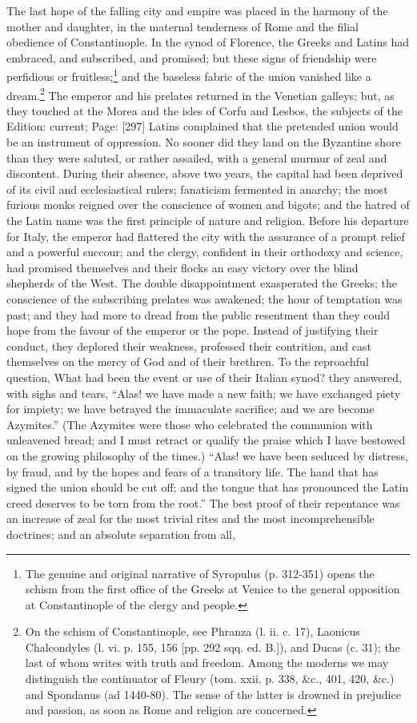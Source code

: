 The last hope of the falling city and empire was placed in the harmony of the mother and daughter, in the maternal tenderness of Rome and the filial obedience of Constantinople. In the synod of Florence, the Greeks and Latins had embraced, and subscribed, and promised; but these signs of friendship were perfidious or fruitless;\footnote{The genuine and original narrative of Syropulus (p. 312-351) opens the schism from the first office of the Greeks at Venice to the general opposition at Constantinople of the clergy and people.} and the baseless fabric of the union vanished like a dream.\footnote{On the schism of Constantinople, see Phranza (l. ii. c. 17), Laonicus Chalcondyles (l. vi. p. 155, 156 [pp. 292 sqq. ed. B.]), and Ducas (c. 31); the last of whom writes with truth and freedom. Among the moderns we may distinguish the continuator of Fleury (tom. xxii. p. 338, \&c., 401, 420, \&c.) and Spondanus (ad 1440-80). The sense of the latter is drowned in prejudice and passion, as soon as Rome and religion are concerned.} The emperor and his prelates returned in the Venetian galleys; but, as they touched at the Morea and the isles of Corfu and Lesbos, the subjects of the Edition: current; Page: [297] Latins complained that the pretended union would be an instrument of oppression. No sooner did they land on the Byzantine shore than they were saluted, or rather assailed, with a general murmur of zeal and discontent. During their absence, above two years, the capital had been deprived of its civil and ecclesiastical rulers; fanaticism fermented in anarchy; the most furious monks reigned over the conscience of women and bigots; and the hatred of the Latin name was the first principle of nature and religion. Before his departure for Italy, the emperor had flattered the city with the assurance of a prompt relief and a powerful succour; and the clergy, confident in their orthodoxy and science, had promised themselves and their flocks an easy victory over the blind shepherds of the West. The double disappointment exasperated the Greeks; the conscience of the subscribing prelates was awakened; the hour of temptation was past; and they had more to dread from the public resentment than they could hope from the favour of the emperor or the pope. Instead of justifying their conduct, they deplored their weakness, professed their contrition, and cast themselves on the mercy of God and of their brethren. To the reproachful question, What had been the event or use of their Italian synod? they answered, with sighs and tears, \texthebrew{“}Alas! we have made a new faith; we have exchanged piety for impiety; we have betrayed the immaculate sacrifice; and we are become Azymites.\texthebrew{}” (The Azymites were those who celebrated the communion with unleavened bread; and I must retract or qualify the praise which I have bestowed on the growing philosophy of the times.) \texthebrew{“}Alas! we have been seduced by distress, by fraud, and by the hopes and fears of a transitory life. The hand that has signed the union should be cut off; and the tongue that has pronounced the Latin creed deserves to be torn from the root.\texthebrew{}” The best proof of their repentance was an increase of zeal for the most trivial rites and the most incomprehensible doctrines; and an absolute separation from all, 